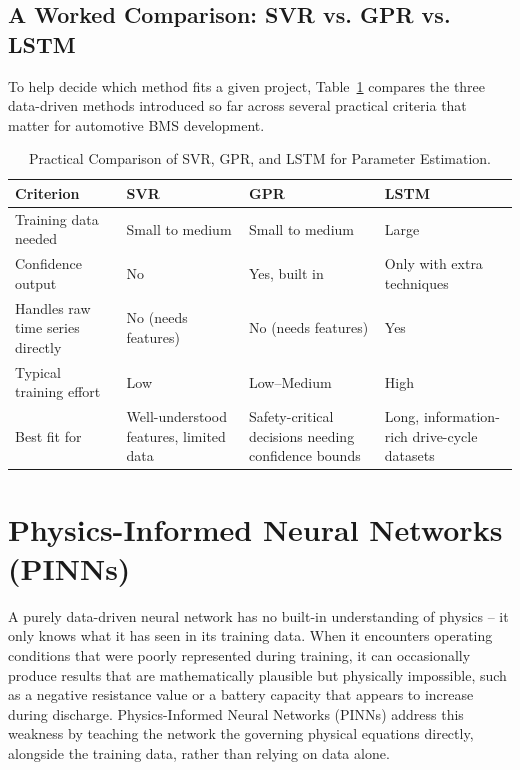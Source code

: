 \subsection{A Worked Comparison: SVR vs. GPR vs. LSTM}
To help decide which method fits a given project, Table~\ref{tab:ch8_method_comparison} compares the three data-driven methods introduced so far across several practical criteria that matter for automotive BMS development.

\begin{table}[htbp]
\centering
\caption{Practical Comparison of SVR, GPR, and LSTM for Parameter Estimation.}
\label{tab:ch8_method_comparison}
\renewcommand{\arraystretch}{1.3}
\footnotesize
\begin{tabularx}{\textwidth}{|p{2.0cm}|X|X|X|}
\hline
\textbf{Criterion} & \textbf{SVR} & \textbf{GPR} & \textbf{LSTM} \\
\hline
Training data needed & Small to medium & Small to medium & Large \\
\hline
Confidence output & No & Yes, built in & Only with extra techniques \\
\hline
Handles raw time series directly & No (needs features) & No (needs features) & Yes \\
\hline
Typical training effort & Low & Low--Medium & High \\
\hline
Best fit for & Well-understood features, limited data & Safety-critical decisions needing confidence bounds & Long, information-rich drive-cycle datasets \\
\hline
\end{tabularx}
\end{table}


\section{Physics-Informed Neural Networks (PINNs)}
\label{sec:pinns}

A purely data-driven neural network has no built-in understanding of physics -- it only knows what it has seen in its training data. When it encounters operating conditions that were poorly represented during training, it can occasionally produce results that are mathematically plausible but physically impossible, such as a negative resistance value or a battery capacity that appears to increase during discharge. Physics-Informed Neural Networks (PINNs) address this weakness by teaching the network the governing physical equations directly, alongside the training data, rather than relying on data alone.




